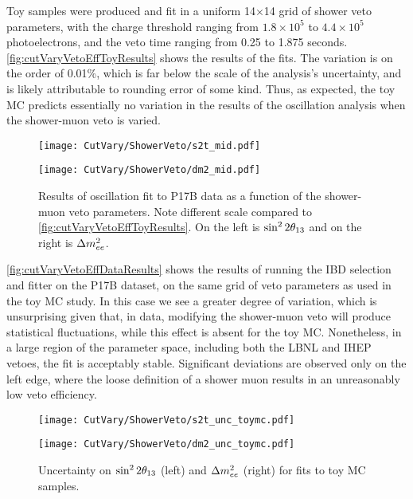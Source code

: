 \documentclass[../thesis.tex]{subfiles}
\begin{document}
Toy samples were produced and fit in a uniform 14$\times$14 grid of shower veto parameters, with the charge threshold ranging from $1.8\times10^5$ to $4.4\times10^5$ photoelectrons, and the veto time ranging from 0.25 to 1.875 seconds. \autoref{fig:cutVaryVetoEffToyResults} shows the results of the fits. The variation is on the order of 0.01\%, which is far below the scale of the analysis's uncertainty, and is likely attributable to rounding error of some kind. Thus, as expected, the toy MC predicts essentially no variation in the results of the oscillation analysis when the shower-muon veto is varied.

\begin{figure}[ht]
  \begin{minipage}{0.5\linewidth}%
    \texttt{[image: CutVary/ShowerVeto/s2t\_mid.pdf]}%
  \end{minipage}%
  \begin{minipage}{0.5\linewidth}%
    \texttt{[image: CutVary/ShowerVeto/dm2\_mid.pdf]}%
  \end{minipage}%
  \caption{Results of oscillation fit to P17B data as a function of the shower-muon veto parameters. Note different scale compared to \autoref{fig:cutVaryVetoEffToyResults}. On the left is $\sin^2 2\theta_{13}$ and on the right is $\Delta m^2_{ee}$.}
  \label{fig:cutVaryVetoEffDataResults}
\end{figure}

\autoref{fig:cutVaryVetoEffDataResults} shows the results of running the IBD selection and fitter on the P17B dataset, on the same grid of veto parameters as used in the toy MC study. In this case we see a greater degree of variation, which is unsurprising given that, in data, modifying the shower-muon veto will produce statistical fluctuations, while this effect is absent for the toy MC. Nonetheless, in a large region of the parameter space, including both the LBNL and IHEP vetoes, the fit is acceptably stable. Significant deviations are observed only on the left edge, where the loose definition of a shower muon results in an unreasonably low veto efficiency.

\begin{figure}[ht]
  \begin{minipage}{0.5\linewidth}%
    \texttt{[image: CutVary/ShowerVeto/s2t\_unc\_toymc.pdf]}%
  \end{minipage}%
  \begin{minipage}{0.5\linewidth}%
    \texttt{[image: CutVary/ShowerVeto/dm2\_unc\_toymc.pdf]}%
  \end{minipage}%
  \caption{Uncertainty on $\sin^2 2\theta_{13}$ (left) and $\Delta m^2_{ee}$ (right) for fits to toy MC samples.}
  \label{fig:cutVaryVetoEffToyUnc}
\end{figure}
\end{document}
